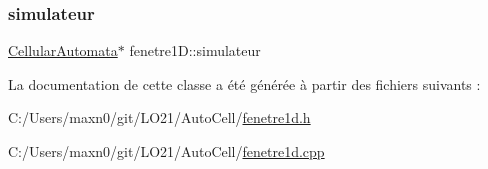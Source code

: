 \mbox{\label{classfenetre1_d_a3eb4498daff2891b1f1a98a7cec26274}} 
\subsubsection{\texorpdfstring{simulateur}{simulateur}}
{\footnotesize\ttfamily \mbox{\hyperlink{class_cellular_automata}{Cellular\+Automata}}$\ast$ fenetre1\+D\+::simulateur\hspace{0.3cm}{\ttfamily [private]}}



La documentation de cette classe a été générée à partir des fichiers suivants \+:\begin{DoxyCompactItemize}
\item 
C\+:/\+Users/maxn0/git/\+L\+O21/\+Auto\+Cell/\mbox{\hyperlink{fenetre1d_8h}{fenetre1d.\+h}}\item 
C\+:/\+Users/maxn0/git/\+L\+O21/\+Auto\+Cell/\mbox{\hyperlink{fenetre1d_8cpp}{fenetre1d.\+cpp}}\end{DoxyCompactItemize}
